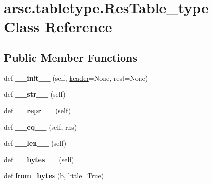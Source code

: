 \hypertarget{classarsc_1_1tabletype_1_1ResTable__type}{}\section{arsc.\+tabletype.\+Res\+Table\+\_\+type Class Reference}
\label{classarsc_1_1tabletype_1_1ResTable__type}
\subsection*{Public Member Functions}
\begin{DoxyCompactItemize}
\item 
\mbox{\label{classarsc_1_1tabletype_1_1ResTable__type_acceaa9ad37f7a7ce61d934e92c8bdefd}} 
def {\bfseries \+\_\+\+\_\+init\+\_\+\+\_\+} (self, \mbox{\hyperlink{classarsc_1_1tabletype_1_1ResTable__type_a569fdc08b8819b982379aead3b6f20e4}{header}}=None, rest=None)
\item 
\mbox{\label{classarsc_1_1tabletype_1_1ResTable__type_a41abb24f3305b0540c4bffc7c28cc777}} 
def {\bfseries \+\_\+\+\_\+str\+\_\+\+\_\+} (self)
\item 
\mbox{\label{classarsc_1_1tabletype_1_1ResTable__type_a2f3d632e57b08254a360b8f310bb7a2b}} 
def {\bfseries \+\_\+\+\_\+repr\+\_\+\+\_\+} (self)
\item 
\mbox{\label{classarsc_1_1tabletype_1_1ResTable__type_aa09ed2eafcde7f67bb5eb0b4f1797092}} 
def {\bfseries \+\_\+\+\_\+eq\+\_\+\+\_\+} (self, rhs)
\item 
\mbox{\label{classarsc_1_1tabletype_1_1ResTable__type_a3e85e5f503c732effe3cf23c05e01900}} 
def {\bfseries \+\_\+\+\_\+len\+\_\+\+\_\+} (self)
\item 
\mbox{\label{classarsc_1_1tabletype_1_1ResTable__type_ae0a60ed2e64568268a12c71a00d3dacb}} 
def {\bfseries \+\_\+\+\_\+bytes\+\_\+\+\_\+} (self)
\item 
\mbox{\label{classarsc_1_1tabletype_1_1ResTable__type_a2887c6b40415bc260ca6f08d5b67caaf}} 
def {\bfseries from\+\_\+bytes} (b, little=True)
\end{DoxyCompactItemize}
